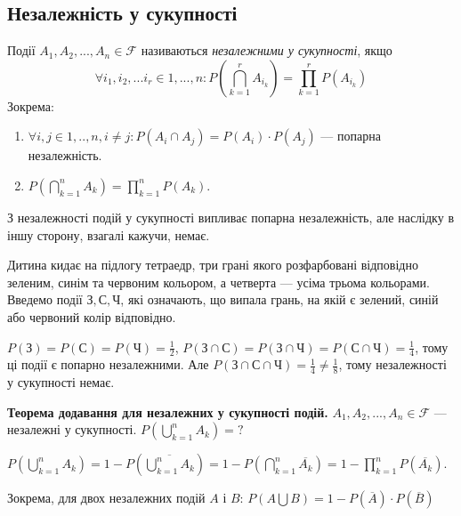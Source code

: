 \subsection{Незалежність у сукупності}
\begin{definition}
    Події $A_1, A_2, ..., A_n \in \mathcal{F}$ називаються \emph{незалежними у сукупності}, якщо
    \begin{equation}\label{eq:indep}
        \forall i_1, i_2, ... i_r \in {1,...,n}: P\left(\bigcap_{k=1}^r A_{i_k}\right) = \prod_{k=1}^r P\left(A_{i_k}\right)
    \end{equation}
    Зокрема:
    \begin{enumerate}
        \item $\forall i, j \in {1,..,n}, i\neq j: P(A_i \cap A_j) = P(A_i)\cdot P(A_j)$ --- попарна незалежність.
        \item $P(\bigcap_{k=1}^n A_k) = \prod_{k=1}^n P(A_k)$.
    \end{enumerate}
\end{definition}
\begin{remark}
    З незалежності подій у сукупності випливає попарна незалежність, 
    але наслідку в іншу сторону, взагалі кажучи, немає.
\end{remark}
\begin{example}
    Дитина кидає на підлогу тетраедр, три грані якого розфарбовані відповідно зеленим, синім та червоним кольором,
    а четверта --- усіма трьома кольорами. Введемо події $\text{З}, \text{С}, \text{Ч}$, які означають, що випала грань,
    на якій є зелений, синій або червоний колір відповідно.

    $P(\text{З}) = P(\text{С}) = P(\text{Ч}) = \frac{1}{2}$, 
    $P(\text{З} \cap \text{С}) = P(\text{З} \cap \text{Ч}) = P(\text{С} \cap \text{Ч}) = \frac{1}{4}$,
    тому ці події є попарно незалежними. Але $P(\text{З} \cap \text{С} \cap \text{Ч}) = \frac{1}{4} \neq \frac{1}{8}$,
    тому незалежності у сукупності немає.
\end{example}

\noindent \textbf{Теорема додавання для незалежних у сукупності подій.}
$A_1, A_2, ..., A_n \in \mathcal{F}$ --- незалежні у сукупності.
$P(\bigcup_{k=1}^n A_k) = \text{?}$

$P(\bigcup_{k=1}^n A_k) = 1 - P(\overline{\bigcup_{k=1}^n A_k}) = 1 - P(\bigcap_{k=1}^n \overline{A_k}) = 1 - \prod_{k=1}^n P(\overline{A_k})$.

\noindent Зокрема, для двох незалежних подій $A$ і $B$: $P(A\bigcup B) = 1 - P(\overline{A}) \cdot P(\overline{B})$

